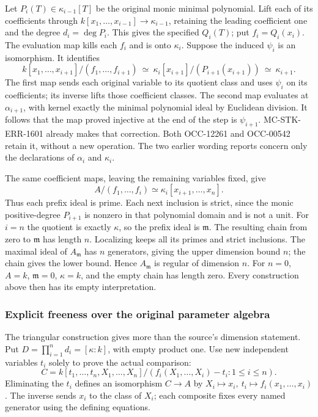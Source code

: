 Let \(P_i(T)\in\kappa_{i-1}[T]\) be the original monic minimal polynomial. Lift each of its coefficients through \(k[x_1,\ldots,x_{i-1}]\to\kappa_{i-1}\), retaining the leading coefficient one and the degree \(d_i=\deg P_i\). This gives the specified \(Q_i(T)\); put \(f_i=Q_i(x_i)\). The evaluation map kills each \(f_i\) and is onto \(\kappa_i\). Suppose the induced \(\psi_i\) is an isomorphism. It identifies \[
 k[x_1,\ldots,x_{i+1}]/(f_1,\ldots,f_{i+1})
 \ \simeq\ \kappa_i[x_{i+1}]/(P_{i+1}(x_{i+1}))
 \ \simeq\ \kappa_{i+1}.
\] The first map sends each original variable to its quotient class and uses \(\psi_i\) on its coefficients; its inverse lifts those coefficient classes. The second map evaluates at \(\alpha_{i+1}\), with kernel exactly the minimal polynomial ideal by Euclidean division. It follows that the map proved injective at the end of the step is \(\psi_{i+1}\). MC-STK-ERR-1601 already makes that correction. Both OCC-12261 and OCC-00542 retain it, without a new operation. The two earlier wording reports concern only the declarations of \(\alpha_i\) and \(\kappa_i\).

The same coefficient maps, leaving the remaining variables fixed, give \[
 A/(f_1,\ldots,f_i)\simeq
 \kappa_i[x_{i+1},\ldots,x_n].
\] Thus each prefix ideal is prime. Each next inclusion is strict, since the monic positive-degree \(P_{i+1}\) is nonzero in that polynomial domain and is not a unit. For \(i=n\) the quotient is exactly \(\kappa\), so the prefix ideal is \(\mathfrak m\). The resulting chain from zero to \(\mathfrak m\) has length \(n\). Localizing keeps all its primes and strict inclusions. The maximal ideal of \(A_{\mathfrak m}\) has \(n\) generators, giving the upper dimension bound \(n\); the chain gives the lower bound. Hence \(A_{\mathfrak m}\) is regular of dimension \(n\). For \(n=0\), \(A=k\), \(\mathfrak m=0\), \(\kappa=k\), and the empty chain has length zero. Every construction above then has its empty interpretation.

\subsubsection{Explicit freeness over the original parameter algebra}\label{algebra-proof-025-explicit-freeness-over-the-original-parameter-algebra}

The triangular construction gives more than the source's dimension statement. Put \(D=\prod_{i=1}^n d_i=[\kappa:k]\), with empty product one. Use new independent variables \(t_i\) solely to prove the actual comparison: \[
 C=k[t_1,\ldots,t_n,X_1,\ldots,X_n]/
       (f_i(X_1,\ldots,X_i)-t_i:1\leq i\leq n).
\] Eliminating the \(t_i\) defines an isomorphism \(C\to A\) by \(X_i\mapsto x_i,\ t_i\mapsto f_i(x_1,\ldots,x_i)\). The inverse sends \(x_i\) to the class of \(X_i\); each composite fixes every named generator using the defining equations.

